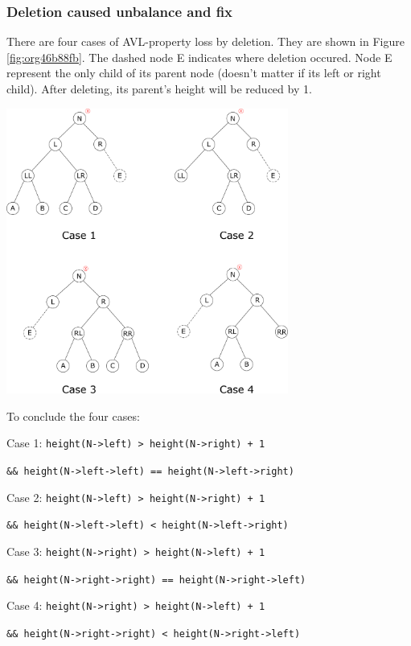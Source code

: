 \documentclass[12pt]{book}
\begin{document}
\subsubsection{Deletion caused unbalance and fix}
\label{sec:org8db6689}
There are four cases of AVL-property loss by deletion. They are shown in Figure \ref{fig:org46b88fb}. The dashed node E indicates where deletion occured. Node E represent the only child of its parent node (doesn't matter if its left or right child). After deleting, its parent's height will be reduced by 1.

\begin{center}
\includegraphics[width=350px]{./img/AVL-deletion.pdf}
\end{center}

To conclude the four cases:

Case 1: \texttt{height(N->left) > height(N->right) + 1}

\texttt{\&\& height(N->left->left) == height(N->left->right)}

Case 2: \texttt{height(N->left) > height(N->right) + 1}

\texttt{\&\& height(N->left->left) < height(N->left->right)}

Case 3: \texttt{height(N->right) > height(N->left) + 1}

\texttt{\&\& height(N->right->right) == height(N->right->left)}

Case 4: \texttt{height(N->right) > height(N->left) + 1}

\texttt{\&\& height(N->right->right) < height(N->right->left)}
\end{document}
